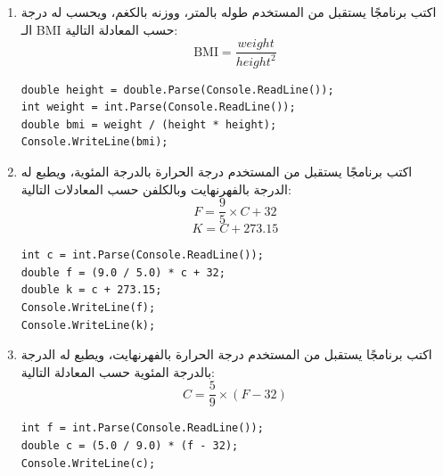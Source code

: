 \documentclass[14pt]{extarticle}
\begin{document}
\begin{enumerate}[itemsep=2em]
\begin{boxSolution}
\begin{english}
\begin{verbatim}
int unitsArabic = int.Parse(Console.ReadLine());
int unitsMath = int.Parse(Console.ReadLine());
int unitsCs = int.Parse(Console.ReadLine());

int totalGrades = arabic * unitsArabic + math * unitsMath + cs * unitsCs;
int totalUnits = unitsArabic + unitsMath + unitsCs;
double average = (double)totalGrades / totalUnits;
Console.WriteLine(average);
\end{verbatim}
\end{english}
\end{boxSolution}
\fi

\item
اكتب برنامجًا يستقبل من المستخدم طوله بالمتر، ووزنه بالكغم، ويحسب له درجة الـ BMI حسب المعادلة التالية:
$$ \text{BMI} = \frac{weight}{height^2} $$
\ifwithsols
\begin{boxSolution}
\begin{english}
\begin{verbatim}
double height = double.Parse(Console.ReadLine());
int weight = int.Parse(Console.ReadLine());
double bmi = weight / (height * height);
Console.WriteLine(bmi);
\end{verbatim}
\end{english}
\end{boxSolution}
\fi
\clearpage

\item
اكتب برنامجًا يستقبل من المستخدم درجة الحرارة بالدرجة المئوية، ويطبع له الدرجة بالفهرنهايت وبالكلفن حسب المعادلات التالية:
$$ F = \frac{9}{5} \times C + 32 $$
$$ K = C + 273.15 $$
\ifwithsols
\begin{boxSolution}
\begin{english}
\begin{verbatim}
int c = int.Parse(Console.ReadLine());
double f = (9.0 / 5.0) * c + 32;
double k = c + 273.15;
Console.WriteLine(f);
Console.WriteLine(k);
\end{verbatim}
\end{english}
\end{boxSolution}
\fi

\item
اكتب برنامجًا يستقبل من المستخدم درجة الحرارة بالفهرنهايت، ويطبع له الدرجة بالدرجة المئوية حسب المعادلة التالية:
$$ C = \frac{5}{9} \times (F - 32) $$
\ifwithsols
\begin{boxSolution}
\begin{english}
\begin{verbatim}
int f = int.Parse(Console.ReadLine());
double c = (5.0 / 9.0) * (f - 32);
Console.WriteLine(c);
\end{verbatim}
\end{english}
\end{boxSolution}
\fi


\end{enumerate}
\end{document}
